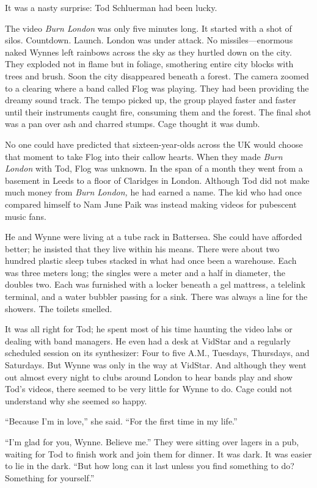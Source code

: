 It was a nasty surprise: Tod Schluerman had been lucky.

The video \textit{Burn London} was only five minutes long. It started with a shot of silos. Countdown. Launch. London was under attack. No missiles---enormous naked Wynnes left rainbows across the sky as they hurtled down on the city. They exploded not in flame but in foliage, smothering entire city blocks with trees and brush. Soon the city disappeared beneath a forest. The camera zoomed to a clearing where a band called Flog was playing. They had been providing the dreamy sound track. The tempo picked up, the group played faster and faster until their instruments caught fire, consuming them and the forest. The final shot was a pan over ash and charred stumps. Cage thought it was dumb.

No one could have predicted that sixteen-year-olds across the UK would choose that moment to take Flog into their callow hearts. When they made \textit{Burn London} with Tod, Flog was unknown. In the span of a month they went from a basement in Leeds to a floor of Claridges in London. Although Tod did not make much money from \textit{Burn London,} he had earned a name. The kid who had once compared himself to Nam June Paik was instead making videos for pubescent music fans.

He and Wynne were living at a tube rack in Battersea. She could have afforded better; he insisted that they live within his means. There were about two hundred plastic sleep tubes stacked in what had once been a warehouse. Each was three meters long; the singles were a meter and a half in diameter, the doubles two. Each was furnished with a locker beneath a gel mattress, a telelink terminal, and a water bubbler passing for a sink. There was always a line for the showers. The toilets smelled.

It was all right for Tod; he spent most of his time haunting the video labs or dealing with band managers. He even had a desk at VidStar and a regularly scheduled session on its synthesizer: Four to five A.M., Tuesdays, Thursdays, and Saturdays. But Wynne was only in the way at VidStar. And although they went out almost every night to clubs around London to hear bands play and show Tod's videos, there seemed to be very little for Wynne to do. Cage could not understand why she seemed so happy.

``Because I'm in love,'' she said. ``For the first time in my life.''

``I'm glad for you, Wynne. Believe me.'' They were sitting over lagers in a pub, waiting for Tod to finish work and join them for dinner. It was dark. It was easier to lie in the dark. ``But how long can it last unless you find something to do? Something for yourself.''

